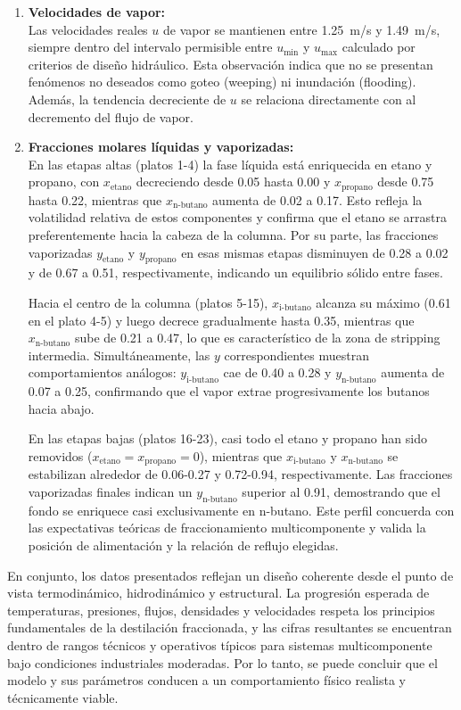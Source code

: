 \begin{enumerate}
    \item \textbf{Velocidades de vapor:}\\
          Las velocidades reales $u$ de vapor se mantienen entre \SI{1.25}{m/s} y \SI{1.49}{m/s}, siempre dentro del intervalo permisible entre $u_{\text{min}}$ y $u_{\text{max}}$ calculado por criterios de diseño hidráulico. Esta observación indica que no se presentan fenómenos no deseados como goteo (weeping) ni inundación (flooding). Además, la tendencia decreciente de $u$ se relaciona directamente con al decremento del flujo de vapor.

    \item \textbf{Fracciones molares líquidas y vaporizadas:}\\
          En las etapas altas (platos 1-4) la fase líquida está enriquecida en etano y propano, con $x_{\text{etano}}$ decreciendo desde 0.05 hasta 0.00 y $x_{\text{propano}}$ desde 0.75 hasta 0.22, mientras que $x_{\text{n-butano}}$ aumenta de 0.02 a 0.17. Esto refleja la volatilidad relativa de estos componentes y confirma que el etano se arrastra preferentemente hacia la cabeza de la columna. Por su parte, las fracciones vaporizadas $y_{\text{etano}}$ y $y_{\text{propano}}$ en esas mismas etapas disminuyen de 0.28 a 0.02 y de 0.67 a 0.51, respectivamente, indicando un equilibrio sólido entre fases.

          Hacia el centro de la columna (platos 5-15), $x_{\text{i-butano}}$ alcanza su máximo (0.61 en el plato 4-5) y luego decrece gradualmente hasta 0.35, mientras que $x_{\text{n-butano}}$ sube de 0.21 a 0.47, lo que es característico de la zona de stripping intermedia. Simultáneamente, las $y$ correspondientes muestran comportamientos análogos: $y_{\text{i-butano}}$ cae de 0.40 a 0.28 y $y_{\text{n-butano}}$ aumenta de 0.07 a 0.25, confirmando que el vapor extrae progresivamente los butanos hacia abajo.

          En las etapas bajas (platos 16-23), casi todo el etano y propano han sido removidos ($x_{\text{etano}}=x_{\text{propano}}=0$), mientras que $x_{\text{i-butano}}$ y $x_{\text{n-butano}}$ se estabilizan alrededor de 0.06-0.27 y 0.72-0.94, respectivamente. Las fracciones vaporizadas finales indican un $y_{\text{n-butano}}$ superior al 0.91, demostrando que el fondo se enriquece casi exclusivamente en n-butano. Este perfil concuerda con las expectativas teóricas de fraccionamiento multicomponente y valida la posición de alimentación y la relación de reflujo elegidas.
\end{enumerate}

En conjunto, los datos presentados reflejan un diseño coherente desde el punto de vista termodinámico, hidrodinámico y estructural. La progresión esperada de temperaturas, presiones, flujos, densidades y velocidades respeta los principios fundamentales de la destilación fraccionada, y las cifras resultantes se encuentran dentro de rangos técnicos y operativos típicos para sistemas multicomponente bajo condiciones industriales moderadas. Por lo tanto, se puede concluir que el modelo y sus parámetros conducen a un comportamiento físico realista y técnicamente viable.
